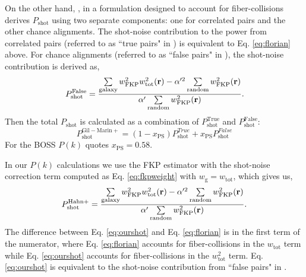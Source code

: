 \documentclass{emulateapj}
\begin{document}
On the other hand, \cite{Gil-Marin:2014aa}, in a formulation designed to account for fiber-collisions derives $P_\mathrm{shot}$ using two separate components: one for correlated pairs and the other chance alignments. The shot-noise contribution to the power from correlated pairs (referred to as ``true pairs" in \citealt{Gil-Marin:2014aa}) is equivalent to Eq. \ref{eq:florian} above. For chance alignments (referred to as ``false pairs" in \citealt{Gil-Marin:2014aa}), the shot-noise contribution is derived as, 
\begin{equation} \label{eq:gm_falsepairs}
P^\mathrm{False}_\mathrm{shot} = \frac{\sum\limits_{\mathrm{galaxy}} w^2_\mathrm{FKP}w^2_\mathrm{tot}({\bf r}) - \alpha'^2 \sum\limits_{\mathrm{random}} w_\mathrm{FKP}^2({\bf r})}{\alpha' \sum\limits_{\mathrm{random}}w_\mathrm{FKP}^2({\bf r})}.
\end{equation}
Then the total $P_\mathrm{shot}$ is calculated as a combination of $P^\mathrm{True}_\mathrm{shot}$ and $P^\mathrm{False}_\mathrm{shot}$: 
\begin{equation} \label{eq:gm_shot}
P^\mathrm{Gil-Marin+}_\mathrm{shot} = (1- x_\mathrm{PS}) P^{True}_\mathrm{shot} + x_\mathrm{PS} P^{False}_\mathrm{shot}
\end{equation}
For the BOSS $P(k)$ \cite{Gil-Marin:2014aa} quotes $x_\mathrm{PS} = 0.58$.

In our $P(k)$ calculations we use the FKP estimator with the shot-noise correction term computed as Eq. \ref{eq:fkpweight} with $w_\mathrm{g} = w_\mathrm{tot}$, which gives us, 
\begin{equation} \label{eq:ourshot}
P^\mathrm{Hahn+}_\mathrm{shot} = \frac{\sum\limits_{\mathrm{galaxy}} w^2_\mathrm{FKP}w^2_\mathrm{tot}({\bf r}) - \alpha'^2 \sum\limits_{\mathrm{random}} w_\mathrm{FKP}^2({\bf r})}{\alpha' \sum\limits_{\mathrm{random}}w_\mathrm{FKP}^2({\bf r})}.
\end{equation}
The difference between Eq. \ref{eq:ourshot} and Eq. \ref{eq:florian} is in the first term of the numerator, where Eq. \ref{eq:florian} accounts for fiber-collisions in the $w_{\mathrm{tot}}$ term while Eq. \ref{eq:ourshot} accounts for fiber-collisions in the $w_\mathrm{tot}^2$ term. Eq. \ref{eq:ourshot} is equivalent to the shot-noise contribution from ``false pairs" in \cite{Gil-Marin:2014aa}. 
\end{document}
